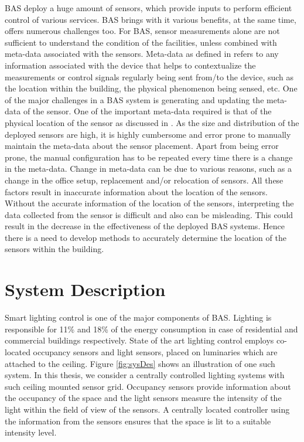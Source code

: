 BAS deploy a huge amount of sensors, which provide inputs to perform efficient control of various services. BAS brings with it various benefits, at the same time, offers numerous challenges too. For BAS, sensor measurements alone are not sufficient to understand the condition of the facilities, unless combined with meta-data associated with the sensors.
Meta-data as defined in \cite{gao2015data} refers to any information associated  with the device that helps to contextualize the measurements or control signals regularly being sent from/to the device, such as the location within the building, the physical phenomenon being sensed, etc. One of the major challenges in a BAS system is generating and updating the meta-data of the sensor.
One of the important meta-data required is that of the physical location of the sensor as discussed in  \cite{liu2009requirements}.
As the size and distribution of the deployed sensors are high, it is highly cumbersome and error prone to manually maintain the meta-data about the sensor placement. Apart from being error prone, the manual configuration has to be repeated every time there is a change in the meta-data. Change in meta-data can be due to various reasons, such as a change in the office setup, replacement and/or relocation of sensors. All these factors result in inaccurate information about the location of the sensors. Without the accurate information of the location of the sensors, interpreting the data collected from the sensor is difficult and also can be misleading. This could result in the decrease in the effectiveness of the deployed BAS systems. Hence there is a need to develop methods to accurately determine the location of the sensors within the building.
\section{System Description}
Smart lighting control is one of the major components of BAS. Lighting is responsible for 11\%  and 18\% of the energy consumption in case of residential and commercial buildings respectively\cite{website}. 
State of the art lighting control employs co-located occupancy sensors and light sensors, placed on luminaries which are attached to the ceiling\cite{pandharipande2015smart,caicedo2016smart,van2014distributed}. Figure \ref{fig:sysDes} shows an illustration of one such system. In this thesis, we consider a centrally controlled lighting systems with such ceiling mounted sensor grid. Occupancy sensors provide information about the occupancy of the space and the light sensors measure the intensity of the light within the field of view of the sensors. A centrally located controller using the information from the sensors ensures that the space is lit to a suitable intensity level.

